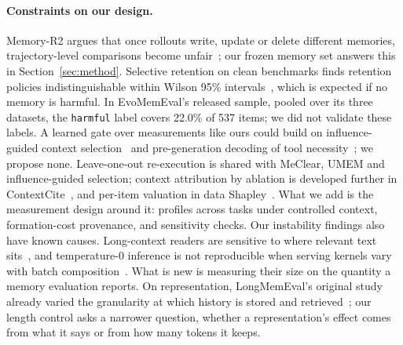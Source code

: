 \paragraph{Constraints on our design.}
Memory-R2 argues that once rollouts write, update or delete different
memories, trajectory-level comparisons become unfair~\cite{memoryrtwo}; our
frozen memory set answers this in Section~\ref{sec:method}. Selective
retention on clean benchmarks finds retention policies indistinguishable
within Wilson 95\% intervals~\cite{traceretain}, which is expected if no
memory is harmful. In EvoMemEval's released sample, pooled over its three datasets, the
\texttt{harmful} label covers 22.0\% of 537 items; we did not validate these
labels. A learned gate over measurements like ours could build on
influence-guided context selection~\cite{influence} and pre-generation
decoding of tool necessity~\cite{when2tool}; we propose none. Leave-one-out
re-execution is shared with MeClear, UMEM and influence-guided
selection; context attribution by ablation is developed further in
ContextCite~\cite{contextcite}, and per-item valuation in data
Shapley~\cite{datashapley}. What we add is the measurement design around it: profiles across tasks under
controlled context, formation-cost provenance, and sensitivity checks. Our instability findings also have known causes. Long-context readers are
sensitive to where relevant text sits~\cite{lostmiddle}, and temperature-0
inference is not reproducible when serving kernels vary with batch
composition~\cite{nondeterminism}. What is new is measuring their size on the quantity
a memory evaluation reports. On
representation, LongMemEval's original study already varied the granularity
at which history is stored and retrieved~\cite{lmev1}; our length control
asks a narrower question, whether a representation's effect comes from what it
says or from how many tokens it keeps.


